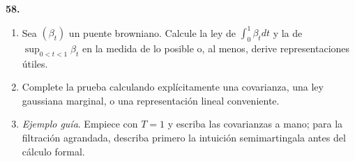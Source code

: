 \documentclass[11pt, letterpaper]{article}
\begin{document}
\begin{ejercicio}
    \textbf{58.} 
    \begin{enumerate}
        \item Sea $(\beta_{t})$ un puente browniano. Calcule la ley de $\int_{0}^{1}\beta_{t} dt$ y la de $\sup_{0<t<1}\beta_{t}$ en la medida de lo posible o, al menos, derive representaciones útiles.
        \item Complete la prueba calculando explícitamente una covarianza, una ley gaussiana marginal, o una representación lineal conveniente.
        \item \textit{Ejemplo guía}. Empiece con $T=1$ y escriba las covarianzas a mano; para la filtración agrandada, describa primero la intuición semimartingala antes del cálculo formal.
    \end{enumerate}
\end{ejercicio}

\vspace{5mm}
\end{document}
